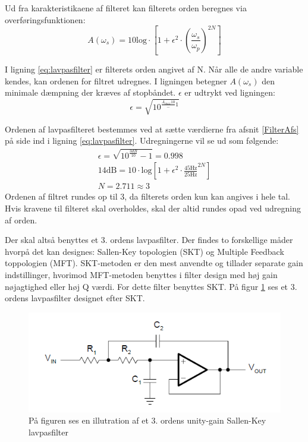 \noindent Ud fra karakteristikaene af filteret kan filterets orden beregnes via overføringsfunktionen:
\begin{equation} \label{eq:lavpasfilter}
A(\omega_s) = 10 \text{log} \cdot \left[1 + \epsilon^2 \cdot (\frac{\omega _s}{\omega _p})^{2N}\right] 
\end{equation}

\noindent I ligning \ref{eq:lavpasfilter} er filterets orden angivet af N. Når alle de andre variable kendes, kan ordenen for filtret udregnes. I ligningen betegner $A(\omega _s)$ den minimale dæmpning der kræves af stopbåndet. $\epsilon$ er udtrykt ved ligningen:
\begin{equation}
\epsilon = \sqrt{10^{\frac{A_{max}{10}} - 1}}
\end{equation}

Ordenen af lavpasfilteret bestemmes ved at sætte værdierne fra afsnit \ref{FilterAfs} på side \pageref{FilterAfs} ind i ligning \ref{eq:lavpasfilter}. Udregningerne vil se ud som følgende:
\begin{align}
\epsilon = \sqrt{10^{\frac{3dB}{10}} - 1} = 0.998 \\
14\text{dB} = 10 \cdot \text{log} \left[1 + \epsilon ^2 \cdot \frac{45\text{Hz}}{25\text{Hz}}^{2N}\right] \\
N = 2.711 \approx 3
\end{align}
\noindent Ordenen af filtret rundes op til 3, da filterets orden kun kan angives i hele tal. Hvis kravene til filteret skal overholdes, skal der altid rundes opad ved udregning af orden.

Der skal altså benyttes et 3. ordens lavpasfilter. Der findes to forskellige måder hvorpå det kan designes: Sallen-Key topologien (SKT) og Multiple Feedback toppologien (MFT). SKT-metoden er den mest anvendte og tillader separate gain indstillinger, hvorimod MFT-metoden benyttes i filter design med høj gain nøjagtighed eller høj Q værdi. For dette filter benyttes SKT. På figur \ref{fig:SallenKey} ses et 3. ordens lavpasfilter designet efter SKT. \cite{Carter2013}
\begin{figure}[H]
	\centering
	\includegraphics[scale=0.8]{figures/cProblemloesning/SallenLavpas.PNG}
	\caption{På figuren ses en illutration af et 3. ordens unity-gain Sallen-Key lavpasfilter} 
	\label{fig:SallenKey}
\end{figure}

